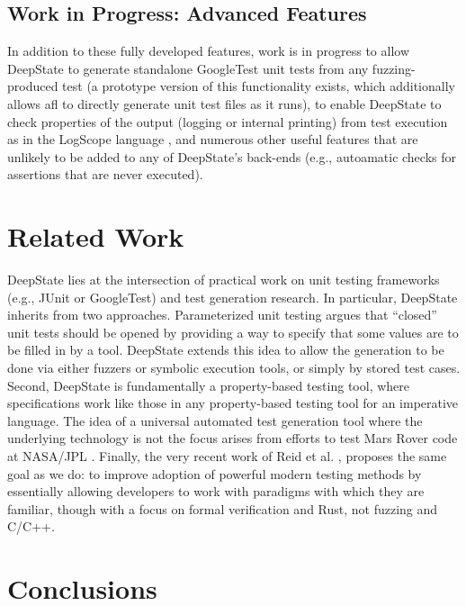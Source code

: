 \documentclass[sigconf]{acmart}
\begin{document}
\subsection{Work in Progress: Advanced Features}

In addition to these fully developed features, work is in progress to allow DeepState to generate standalone GoogleTest unit tests from any fuzzing-produced test (a prototype version of this functionality exists, which additionally allows afl to directly generate unit test files as it runs), to enable DeepState to check properties of the output (logging or internal printing) from test execution as in the LogScope language \cite{scriptstospecs}, and numerous other useful features that are unlikely to be added to any of DeepState's back-ends (e.g., autoamatic checks for assertions that are never executed).

\section{Related Work}

DeepState lies at the intersection of practical work on unit testing frameworks (e.g., JUnit or GoogleTest) and test generation research.  In particular, DeepState inherits from two approaches.  Parameterized unit testing \cite{ParamUnit,UnitMeister} argues that ``closed'' unit tests should be opened by providing a way to specify that some values are to be filled in by a tool.  DeepState extends this idea to allow the generation to be done via either fuzzers or symbolic execution tools, or simply by stored test cases.  Second, DeepState is fundamentally a property-based testing \cite{ClaessenH00}  tool, where specifications work like those in any property-based testing tool for an imperative language.  The idea of a universal automated test generation tool where the underlying technology is not the focus arises from efforts to test Mars Rover code at NASA/JPL \cite{AMAI,WODACommon,WODA08}.  Finally, the very recent work of Reid et al. \cite{reid2020making}, proposes the same goal as we do: to improve adoption of powerful modern testing methods by essentially allowing developers to work with paradigms with which they are familiar, though with a focus on formal verification and Rust, not fuzzing and C/C++.

\section{Conclusions}
\end{document}

